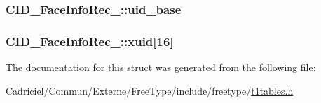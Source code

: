 \hypertarget{struct_c_i_d___face_info_rec___a1fae2d9b863a9e27089894789ab4413e}{
\subsubsection[{uid\-\_\-base}]{ C\-I\-D\-\_\-\-Face\-Info\-Rec\-\_\-\-::uid\-\_\-base}}\label{struct_c_i_d___face_info_rec___a1fae2d9b863a9e27089894789ab4413e}
\hypertarget{struct_c_i_d___face_info_rec___a32cd8836dd8a395d9aa6fb5831f06b27}{
\subsubsection[{xuid}]{ C\-I\-D\-\_\-\-Face\-Info\-Rec\-\_\-\-::xuid\mbox{[}16\mbox{]}}}\label{struct_c_i_d___face_info_rec___a32cd8836dd8a395d9aa6fb5831f06b27}


The documentation for this struct was generated from the following file\-:\begin{DoxyCompactItemize}
\item 
Cadriciel/\-Commun/\-Externe/\-Free\-Type/include/freetype/\hyperlink{t1tables_8h}{t1tables.\-h}\end{DoxyCompactItemize}

